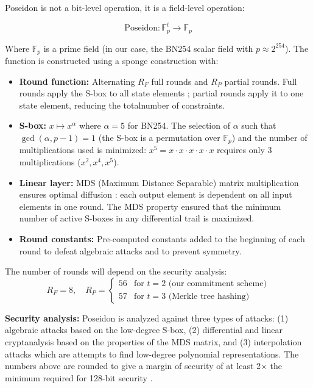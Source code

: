 \documentclass[12pt, a4paper]{report}
\begin{document}
Poseidon is not a bit-level operation, it is a field-level operation:

\begin{equation}
\text{Poseidon}: \mathbb{F}_p^t \rightarrow \mathbb{F}_p
\label{eq:poseidon_def}
\end{equation}

Where $\mathbb{F}_p$ is a prime field (in our case, the BN254 scalar field with $p \approx 2^{254}$). The function is constructed using a sponge construction with:
\begin{itemize}
    \item \textbf{Round function:} Alternating $R_F$ full rounds and $R_P$ partial rounds. Full rounds apply the S-box to all state elements ; partial rounds apply it to one state element, reducing the totalnumber of constraints.
    \item \textbf{S-box:} $x \mapsto x^\alpha$ where $\alpha = 5$ for BN254. The selection of $\alpha$ such that $\gcd(\alpha, p-1) = 1$ (the S-box is a permutation over $\mathbb{F}_p$)  and the number of multiplications used is minimized: $x^5 = x \cdot x \cdot x \cdot x \cdot x$ requires only 3 multiplications ($x^2, x^4, x^5$).
    \item \textbf{Linear layer:} MDS (Maximum Distance Separable) matrix multiplication ensures optimal diffusion : each output element is dependent on all input elements in one round. The MDS property ensured that the minimum number of active S-boxes in any differential trail is maximized.
    \item \textbf{Round constants:} Pre-computed constants added to the beginning of each round to defeat algebraic attacks and to prevent symmetry.
\end{itemize}

The number of rounds will depend on the security analysis:
\begin{equation}
R_F = 8, \quad R_P = \begin{cases} 56 & \text{for } t = 2 \text{ (our commitment scheme)} \\ 57 & \text{for } t = 3 \text{ (Merkle tree hashing)} \end{cases}
\end{equation}

\textbf{Security analysis:} Poseidon is analyzed against three types of attacks: (1) algebraic attacks based on the low-degree S-box, (2) differential and linear cryptanalysis based on the properties of the MDS matrix, and (3) interpolation attacks which are attempts to find low-degree polynomial representations. The numbers above are rounded to give a margin of security of at least 2× the minimum required for 128-bit security \cite{grassi2021poseidon}.
\end{document}
